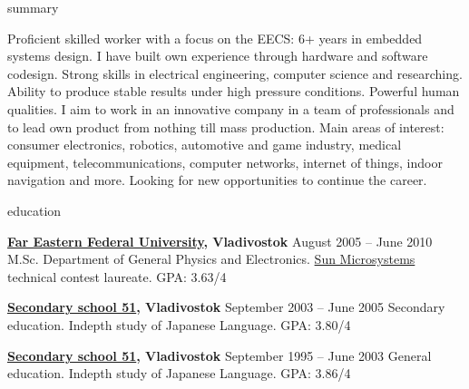 \documentclass{template}
\begin{document}

\begin{rSection}{summary}

Proficient skilled worker with a focus on the EECS: 6+ years in embedded systems design. I have built own experience through hardware and
software codesign. Strong skills in electrical engineering, computer science and researching. Ability to produce stable results under high
pressure conditions. Powerful human qualities. I aim to work in an innovative company in a team of professionals and to lead own product
from nothing till mass production. Main areas of interest: consumer electronics, robotics, automotive and game industry, medical equipment,
telecommunications, computer networks, internet of things, indoor navigation and more. Looking for new opportunities to continue the career.

\end{rSection}


\begin{rSection}{education}

{\bf \href{https://www.dvfu.ru/en/}{Far Eastern Federal University}, Vladivostok} \hfill {August 2005 -- June 2010} \newline
M.Sc. Department of General Physics and Electronics. \newline
\href{http://www.oracle.com}{Sun Microsystems} technical contest laureate. \newline
GPA: 3.63/4

{\bf \href{http://www.school51.pupils.ru}{Secondary school 51}, Vladivostok} \hfill {September 2003 -- June 2005} \newline
Secondary education. \newline
Indepth study of Japanese Language. \newline
GPA: 3.80/4

{\bf \href{http://www.school51.pupils.ru}{Secondary school 51}, Vladivostok} \hfill {September 1995 -- June 2003} \newline
General education. \newline
Indepth study of Japanese Language. \newline
GPA: 3.86/4

\end{rSection}
\end{document}
